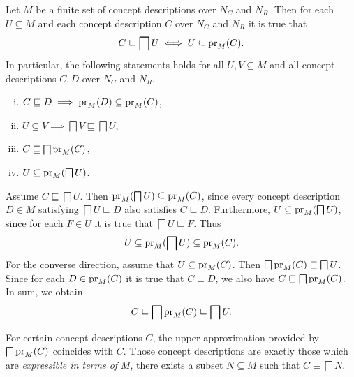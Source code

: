 \begin{Lemma}
  \label{lem:pr-bigsqcap-forms-Galois-connection}
  Let $M$ be a finite set of concept descriptions over $N_C$ and $N_R$.  Then for each $U
  \subseteq M$ and each concept description $C$ over $N_C$ and $N_R$ it is true that
  \begin{equation*}
    C \sqsubseteq \bigsqcap U \iff U \subseteq \operatorname{pr}_M(C).
  \end{equation*}
  In particular, the following statements holds for all $U, V \subseteq M$ and all concept
  descriptions $C, D$ over $N_C$ and $N_R$.
  \begin{enumerate}[i. ]
  \item $C \sqsubseteq D \implies \operatorname{pr}_M(D) \subseteq \operatorname{pr}_M(C)$,
  \item $U \subseteq V \implies \bigsqcap V \sqsubseteq \bigsqcap U$,
  \item $C \sqsubseteq \bigsqcap \operatorname{pr}_M(C)$,
  \item $U \subseteq \operatorname{pr}_M(\bigsqcap U)$.
  \end{enumerate}
\end{Lemma}
\begin{Proof}
  Assume $C \sqsubseteq \bigsqcap U$.  Then $\operatorname{pr}_M(\bigsqcap U) \subseteq \operatorname{pr}_M(C)$, since
  every concept description $D \in M$ satisfying $\bigsqcap U \sqsubseteq D$ also
  satisfies $C \sqsubseteq D$.  Furthermore, $U \subseteq \operatorname{pr}_M(\bigsqcap U)$, since for
  each $F \in U$ it is true that $\bigsqcap U \sqsubseteq F$.  Thus
  \begin{equation*}
    U \subseteq \operatorname{pr}_M(\bigsqcap U) \subseteq \operatorname{pr}_M(C).
  \end{equation*}
  For the converse direction, assume that $U \subseteq \operatorname{pr}_M(C)$.  Then $\bigsqcap
  \operatorname{pr}_M(C) \sqsubseteq \bigsqcap U$.  Since for each $D \in \operatorname{pr}_M(C)$ it is true that $C
  \sqsubseteq D$, we also have $C \sqsubseteq \bigsqcap \operatorname{pr}_M(C)$.  In sum, we obtain
  \begin{equation*}
    C \sqsubseteq \bigsqcap \operatorname{pr}_M(C) \sqsubseteq \bigsqcap U.
  \end{equation*}
\end{Proof}

For certain concept descriptions $C$, the upper approximation provided by $\bigsqcap
\operatorname{pr}_M(C)$ coincides with $C$.  Those concept descriptions are exactly those which are
\emph{expressible in terms of} $M$, \ie there exists a subset $N \subseteq M$ such that $C
\equiv \bigsqcap N$.

